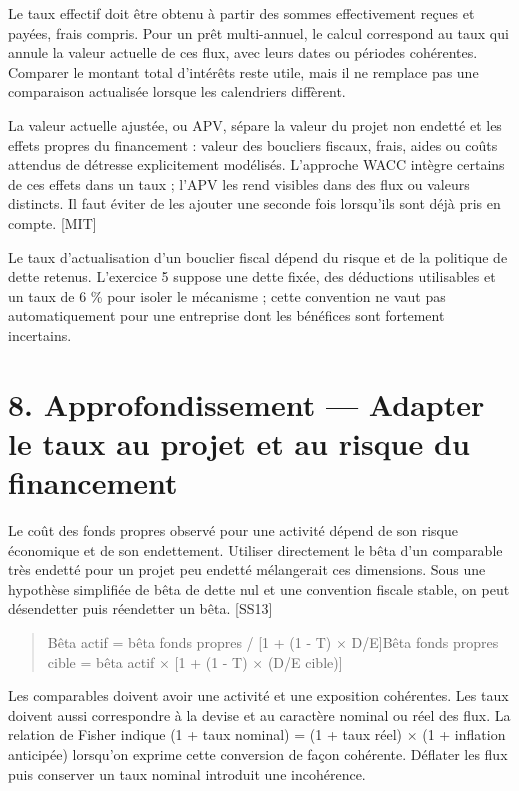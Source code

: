 \documentclass[12pt,a4paper]{article}
\begin{document}
Le taux effectif doit être obtenu à partir des sommes effectivement reçues et payées, frais compris. Pour un prêt multi-annuel, le calcul correspond au taux qui annule la valeur actuelle de ces flux, avec leurs dates ou périodes cohérentes. Comparer le montant total d’intérêts reste utile, mais il ne remplace pas une comparaison actualisée lorsque les calendriers diffèrent.


La valeur actuelle ajustée, ou APV, sépare la valeur du projet non endetté et les effets propres du financement : valeur des boucliers fiscaux, frais, aides ou coûts attendus de détresse explicitement modélisés. L’approche WACC intègre certains de ces effets dans un taux ; l’APV les rend visibles dans des flux ou valeurs distincts. Il faut éviter de les ajouter une seconde fois lorsqu’ils sont déjà pris en compte. [MIT]


Le taux d’actualisation d’un bouclier fiscal dépend du risque et de la politique de dette retenus. L’exercice 5 suppose une dette fixée, des déductions utilisables et un taux de 6 \% pour isoler le mécanisme ; cette convention ne vaut pas automatiquement pour une entreprise dont les bénéfices sont fortement incertains.

\section*{8. Approfondissement --- Adapter le taux au projet et au risque du financement}
Le coût des fonds propres observé pour une activité dépend de son risque économique et de son endettement. Utiliser directement le bêta d’un comparable très endetté pour un projet peu endetté mélangerait ces dimensions. Sous une hypothèse simplifiée de bêta de dette nul et une convention fiscale stable, on peut désendetter puis réendetter un bêta. [SS13]



\begin{quote}\small Bêta actif = bêta fonds propres / [1 + (1 - T) $\times$ D/E]\newline Bêta fonds propres cible = bêta actif $\times$ [1 + (1 - T) $\times$ (D/E cible)]\end{quote}

Les comparables doivent avoir une activité et une exposition cohérentes. Les taux doivent aussi correspondre à la devise et au caractère nominal ou réel des flux. La relation de Fisher indique (1 + taux nominal) = (1 + taux réel) $\times$ (1 + inflation anticipée) lorsqu’on exprime cette conversion de façon cohérente. Déflater les flux puis conserver un taux nominal introduit une incohérence.
\end{document}
